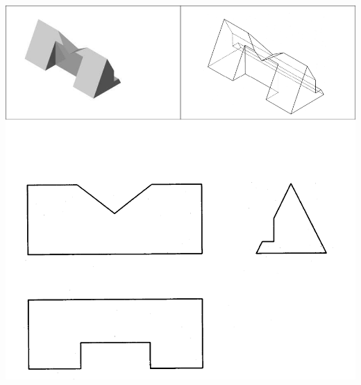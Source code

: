 \documentclass[11pt,oneside]{article}
\begin{document}
\begin{center}
\includegraphics[width=.9\textwidth]{png/fig23}
\end{center}
\end{document}
